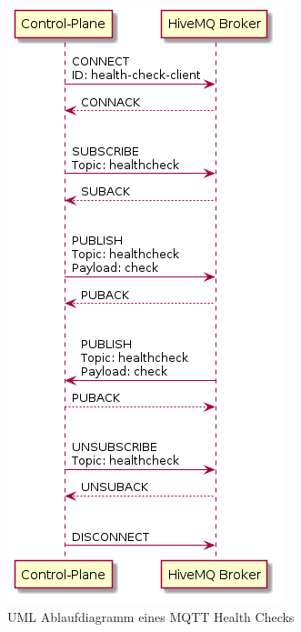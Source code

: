 \begin{figure}
    \centering
    \includegraphics[scale=0.5]{gen/health-check.png}
    \caption{UML Ablaufdiagramm eines MQTT Health Checks}
    \label{fig:health-check-sequence}
\end{figure}

